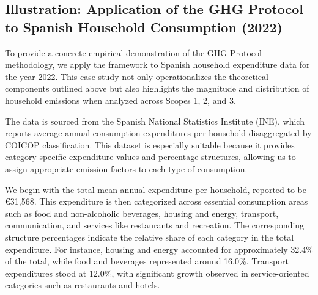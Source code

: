 \documentclass[12pt,a4paper]{article}%
\begin{document}
\subsection{Illustration: Application of the GHG Protocol to Spanish Household Consumption (2022)}

To provide a concrete empirical demonstration of the GHG Protocol methodology, we apply the framework to Spanish household expenditure data for the year 2022. This case study not only operationalizes the theoretical components outlined above but also highlights the magnitude and distribution of household emissions when analyzed across Scopes 1, 2, and 3.

The data is sourced from the Spanish National Statistics Institute (INE), which reports average annual consumption expenditures per household disaggregated by COICOP classification. This dataset is especially suitable because it provides category-specific expenditure values and percentage structures, allowing us to assign appropriate emission factors to each type of consumption.

We begin with the total mean annual expenditure per household, reported to be €31,568. This expenditure is then categorized across essential consumption areas such as food and non-alcoholic beverages, housing and energy, transport, communication, and services like restaurants and recreation. The corresponding structure percentages indicate the relative share of each category in the total expenditure. For instance, housing and energy accounted for approximately 32.4\% of the total, while food and beverages represented around 16.0\%. Transport expenditures stood at 12.0\%, with significant growth observed in service-oriented categories such as restaurants and hotels.
\end{document}
